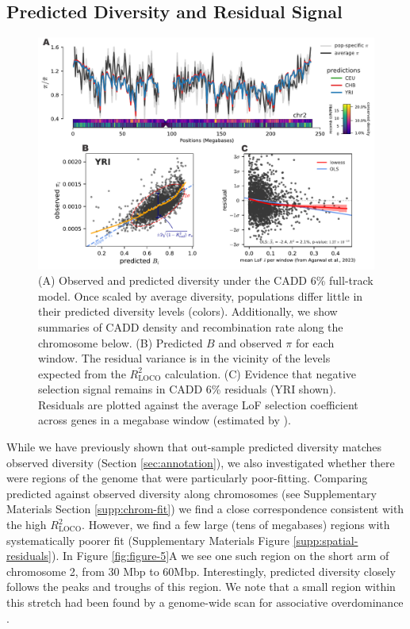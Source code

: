 \documentclass[11pt]{article}
\begin{document}
\subsection*{Predicted Diversity and Residual Signal}

\begin{figure}[htbp] \centering
    \includegraphics[width=\textwidth]{figures/figure_6.pdf} 

    \caption{(A) Observed and predicted diversity under the CADD 6\% full-track
        model. Once scaled by average diversity, populations differ little in
        their predicted diversity levels (colors). Additionally, we show
        summaries of CADD density and recombination rate along the chromosome
        below. (B) Predicted $B$ and observed $\pi$ for each window. The
        residual variance is in the vicinity of the levels expected from the
        $R_\text{LOCO}^2$ calculation. (C) Evidence that negative selection
    signal remains in CADD 6\% residuals (YRI shown). Residuals are plotted
against the average LoF selection coefficient across genes in a megabase window
(estimated by \cite{Agarwal2023-un}).}

  \label{fig:figure-6}
\end{figure}

While we have previously shown that out-sample predicted diversity matches
observed diversity (Section \ref{sec:annotation}), we also investigated whether
there were regions of the genome that were particularly poor-fitting. Comparing
predicted against observed diversity along chromosomes (see Supplementary
Materials Section \ref{supp:chrom-fit}) we find a close correspondence
consistent with the high $R_\text{LOCO}^2$. However, we find a few large (tens
of megabases) regions with systematically poorer fit (Supplementary Materials
Figure \ref{supp:spatial-residuals}). In Figure \ref{fig:figure-5}A we see one
such region on the short arm of chromosome 2, from 30 Mbp to 60Mbp.
Interestingly, predicted diversity closely follows the peaks and troughs of
this region. We note that a small region within this stretch had been found by
a genome-wide scan for associative overdominance \parencite{Gilbert2020-aw}.  
\end{document}
